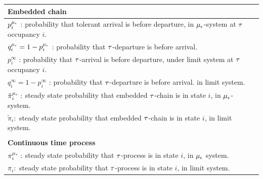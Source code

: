 \begin{table}[]
\begin{center}
\begin{tabular}{|l|}
	
			\\ 
			\centerline{\bf Embedded chain}  \\
			\hline \hline
			$p_i^{\mu_\epsilon}$ : probability that tolerant arrival is before departure,  in  ${\mu_\epsilon}$-system at ${\tau}$ occupancy $i$.
			\\ \hline
			 $q_i^{\mu_\epsilon} = 1- p_i^{\mu_\epsilon}$ : probability that ${\tau}$-departure is before arrival.
		    \\ \hline
	     	$p_i^\infty$ : probability that ${\tau}$-arrival is before departure, under limit system at ${\tau}$ occupancy $i$.
	     	\\ \hline
			  $q_i^\infty = 1-  p_i^\infty$ :   probability that ${\tau}$-departure is before arrival. in limit system. 
			 \\ \hline  
			  	$\tilde{\pi}^{\mu_\epsilon}_i: $ steady state probability  that embedded ${\tau}$-chain is in state $i$, in ${\mu_\epsilon}$-system. 
			 \\ \hline
			  		$\tilde{\pi}_i : $ steady state probability  that embedded ${\tau}$-chain is in state $i$, in limit system.
			  \\  \hline
			  \hline 
			  \\
			 \centerline{ \bf Continuous time process  }
			  \\
			  \hline \hline 
			$\pi^{\mu_\epsilon}_i  :$ steady state   probability  that  ${\tau}$-process is in state $i$, in ${\mu_\epsilon}$ system. \\ \hline
			$\pi_i : $ steady state   probability  that  ${\tau}$-process is in state $i$, in limit system.
		    \\ \hline

\end{tabular}
\end{center}
\end{table}
